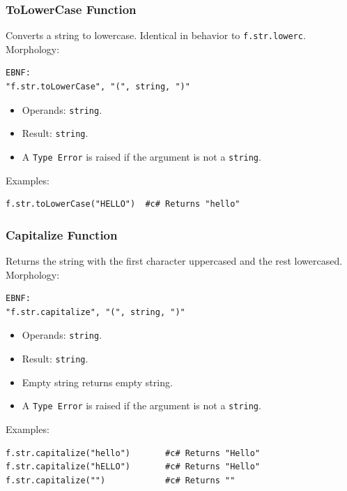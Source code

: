 \subsubsection{ToLowerCase Function}
Converts a string to lowercase. Identical in behavior to \texttt{f.str.lowerc}. \\
Morphology:
\begin{verbatim}
EBNF:
"f.str.toLowerCase", "(", string, ")"
\end{verbatim}
\begin{itemize}
\item Operands: \texttt{string}.
\item Result: \texttt{string}.
\item A \texttt{Type Error} is raised if the argument is not a \texttt{string}.
\end{itemize}
Examples:
\begin{verbatim}
f.str.toLowerCase("HELLO")  #c# Returns "hello"
\end{verbatim}

\subsubsection{Capitalize Function}
Returns the string with the first character uppercased and the rest lowercased. \\
Morphology:
\begin{verbatim}
EBNF:
"f.str.capitalize", "(", string, ")"
\end{verbatim}
\begin{itemize}
\item Operands: \texttt{string}.
\item Result: \texttt{string}.
\item Empty string returns empty string.
\item A \texttt{Type Error} is raised if the argument is not a \texttt{string}.
\end{itemize}
Examples:
\begin{verbatim}
f.str.capitalize("hello")       #c# Returns "Hello"
f.str.capitalize("hELLO")       #c# Returns "Hello"
f.str.capitalize("")            #c# Returns ""
\end{verbatim}

